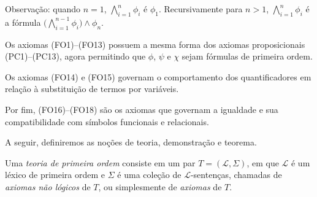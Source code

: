\begin{metadefinition}
        Observação: quando $n=1$, $\bigwedge_{i=1}^n\phi_i$ é $\phi_1$.
        Recursivamente para $n>1$, $\bigwedge_{i=1}^n\phi_i$ é a fórmula $\Big(\bigwedge_{i=1}^{n-1}\phi_i\Big)\land\phi_n$.
\end{metadefinition}

Os axiomas (FO1)--(FO13) possuem a mesma forma dos axiomas proposicionais (PC1)--(PC13), agora permitindo que $\phi$, $\psi$ e $\chi$ sejam fórmulas de primeira ordem.

Os axiomas (FO14) e (FO15) governam o comportamento dos quantificadores em relação à substituição de termos por variáveis.

Por fim, (FO16)--(FO18) são os axiomas que governam a igualdade e sua compatibilidade com símbolos funcionais e relacionais.

A seguir, definiremos as noções de teoria, demonstração e teorema.

\begin{metadefinition}[Teoria]\label{mdef:teoriaPrimeiraOrdem}
    Uma \emph{teoria de primeira ordem} consiste em um par $T = (\mathcal L, \Sigma)$, em que $\mathcal L$ é um léxico de primeira ordem e $\Sigma$ é uma coleção de $\mathcal L$-sentenças, chamadas de \emph{axiomas não lógicos} de $T$, ou simplesmente de \emph{axiomas} de $T$.
\end{metadefinition}

